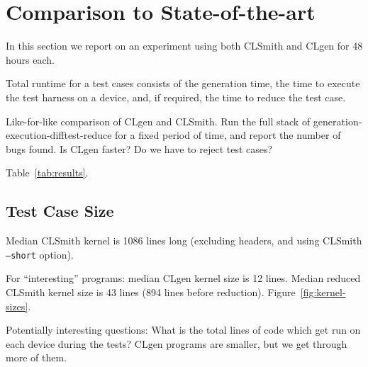 \section{Comparison to State-of-the-art}

In this section we report on an experiment using both CLSmith and CLgen for 48 hours each.

Total runtime for a test cases consists of the generation time, the time to execute the test harness on a device, and, if required, the time to reduce the test case.

Like-for-like comparison of CLgen and CLSmith. Run the full stack of generation-execution-difftest-reduce for a fixed period of time, and report the number of bugs found. Is CLgen faster? Do we have to reject test cases?

Table~\ref{tab:results}.



\subsection{Test Case Size}

Median CLSmith kernel is 1086 lines long (excluding headers, and using CLSmith \texttt{--short} option).

For ``interesting'' programs: median CLgen kernel size is 12 lines. Median reduced CLSmith kernel size is 43 lines (894 lines before reduction). Figure~\ref{fig:kernel-sizes}.

Potentially interesting questions: What is the total lines of code which get run on each device during the tests? CLgen programs are smaller, but we get through more of them.

